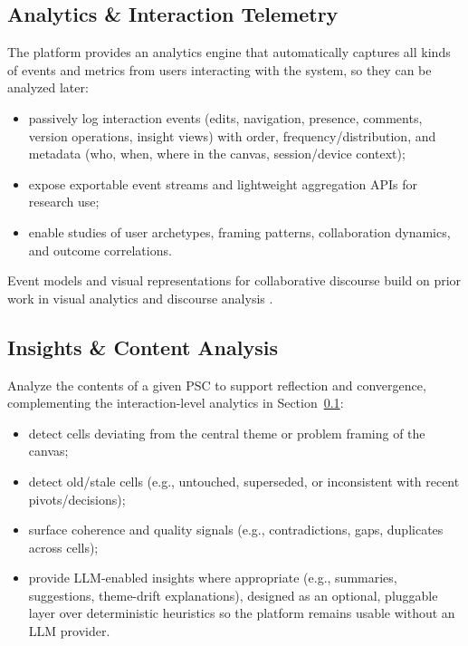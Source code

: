 \documentclass[11pt,a4paper]{article}
\begin{document}
\subsection{Analytics \& Interaction Telemetry}
\label{sec:analytics}

The platform provides an analytics engine that automatically captures all kinds of events and metrics from users interacting with the system, so they can be analyzed later:
\begin{itemize}
  \item passively log interaction events (edits, navigation, presence, comments, version operations, insight views) with order, frequency/distribution, and metadata (who, when, where in the canvas, session/device context);
  \item expose exportable event streams and lightweight aggregation APIs for research use;
  \item enable studies of user archetypes, framing patterns, collaboration dynamics, and outcome correlations.
\end{itemize}

Event models and visual representations for collaborative discourse build on prior work in visual analytics and discourse analysis \citep{chen2020collaborative,chen2021large,hu2021systematic}.

\subsection{Insights \& Content Analysis}

Analyze the contents of a given PSC to support reflection and convergence, complementing the interaction-level analytics in Section~\ref{sec:analytics}:
\begin{itemize}
  \item detect cells deviating from the central theme or problem framing of the canvas;
  \item detect old/stale cells (e.g., untouched, superseded, or inconsistent with recent pivots/decisions);
  \item surface coherence and quality signals (e.g., contradictions, gaps, duplicates across cells);
  \item provide LLM-enabled insights where appropriate (e.g., summaries, suggestions, theme-drift explanations), designed as an optional, pluggable layer over deterministic heuristics so the platform remains usable without an LLM provider.
\end{itemize}
\end{document}
